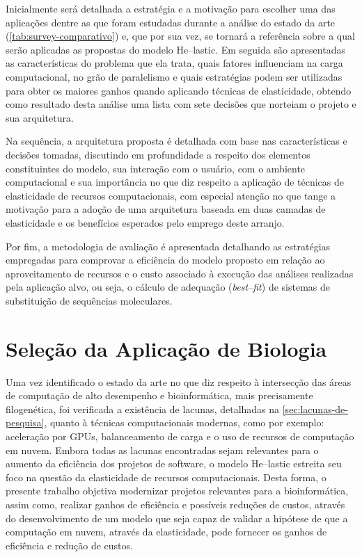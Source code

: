 \documentclass[english,brazilian]{UNISINOSmonografia} %
\begin{document}
Inicialmente será detalhada a estratégia e a motivação para escolher uma das aplicações dentre as que foram estudadas durante a análise do estado da arte (\autoref{tab:survey-comparativo}) e, que por sua vez, se tornará a referência sobre a qual serão aplicadas as propostas do modelo \textsf{He}--lastic.
Em seguida são apresentadas as características do problema que ela trata, quais fatores influenciam na carga computacional, no grão de paralelismo e quais estratégias podem ser utilizadas para obter os maiores ganhos quando aplicando técnicas de elasticidade, obtendo como resultado desta análise uma lista com sete decisões que norteiam o projeto e sua arquitetura.


Na sequência, a arquitetura proposta é detalhada com base nas características e decisões tomadas, discutindo em profundidade a respeito dos elementos constituintes do modelo, sua interação com o usuário, com o ambiente computacional e sua importância no que diz respeito a aplicação de técnicas de elasticidade de recursos computacionais, com especial atenção no que tange a motivação para a adoção de uma arquitetura baseada em duas camadas de elasticidade e os benefícios esperados pelo emprego deste arranjo.




Por fim, a metodologia de avaliação é apresentada detalhando as estratégias empregadas para comprovar a eficiência do modelo proposto em relação ao aproveitamento de recursos e o custo associado à execução das análises realizadas pela aplicação alvo, ou seja, o cálculo de adequação (\textit{best--fit}) de sistemas de substituição de sequências moleculares.




\section{Seleção da Aplicação de Biologia} %
\label{sec:modelo-selecao}


Uma vez identificado o estado da arte no que diz respeito à intersecção das áreas de computação de alto desempenho e bioinformática, mais precisamente filogenética, foi verificada a existência de lacunas, detalhadas na \autoref{sec:lacunas-de-pesquisa}, quanto à técnicas computacionais modernas, como por exemplo: aceleração por GPUs, balanceamento de carga e o uso de recursos de computação em nuvem.
Embora todas as lacunas encontradas sejam relevantes para o aumento da eficiência dos projetos de software, o modelo \textsf{He}--lastic estreita seu foco na questão da elasticidade de recursos computacionais.
Desta forma, o presente trabalho objetiva modernizar projetos relevantes para a bioinformática, assim como, realizar ganhos de eficiência e possíveis reduções de custos, através do desenvolvimento de um modelo que seja capaz de validar a hipótese de que a computação em nuvem, através da elasticidade, pode fornecer os ganhos de eficiência e redução de custos.
\end{document}
